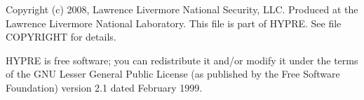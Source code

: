 \documentclass{article}
\begin{document}
\begin{cxxContents}
\begin{cxxContents}
\begin{cxxContents}
\end{cxxContents}
\begin{cxxContents}
\end{cxxContents}
\end{cxxContents}
\begin{cxxContents}
\begin{cxxContents}
\end{cxxContents}
\begin{cxxContents}
\end{cxxContents}
\begin{cxxContents}
\end{cxxContents}
\begin{cxxContents}
\end{cxxContents}
\end{cxxContents}
\end{cxxContents}
\clearpage\pagebreak
\begin{cxxdoc}



Copyright (c) 2008,  Lawrence Livermore National Security, LLC.
Produced at the Lawrence Livermore National Laboratory.
This file is part of HYPRE.  See file COPYRIGHT for details.

HYPRE is free software; you can redistribute it and/or modify it under the
terms of the GNU Lesser General Public License (as published by the Free
Software Foundation) version 2.1 dated February 1999.


\end{cxxdoc}
\end{document}
